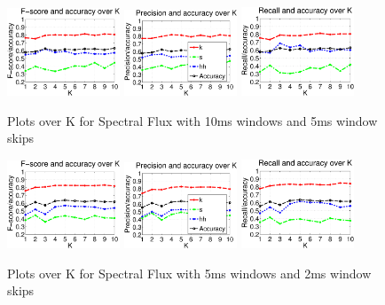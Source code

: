 		\begin{figure}
		
		
			\centering\includegraphics[width=0.3\textwidth]{tex/appendices/test/sflux105FP.png}
			\centering\includegraphics[width=0.3\textwidth]{tex/appendices/test/sflux105_P.png}
			\centering\includegraphics[width=0.3\textwidth]{tex/appendices/test/sflux105_R.png}
				
				\caption{Plots over K for Spectral Flux with 10ms windows and 5ms window skips}
		\end{figure}
		\begin{figure}
		
		
			\centering\includegraphics[width=0.3\textwidth]{tex/appendices/test/sflux52FP.png}
			\centering\includegraphics[width=0.3\textwidth]{tex/appendices/test/sflux52_P.png}
			\centering\includegraphics[width=0.3\textwidth]{tex/appendices/test/sflux52_R.png}
				
				\caption{Plots over K for Spectral Flux with 5ms windows and 2ms window skips}
		\end{figure}
		
